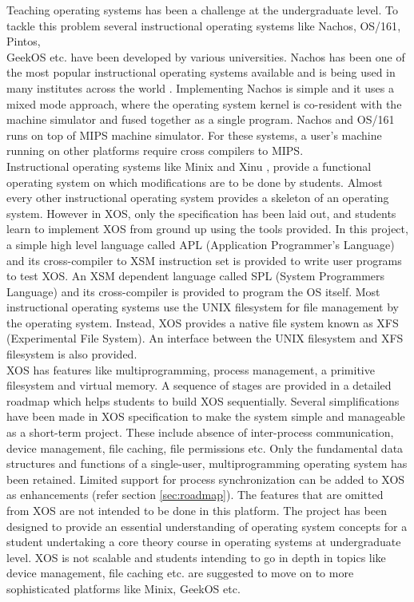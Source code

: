 \documentclass[10pt]{report}
\begin{document}
Teaching operating systems has been a challenge at the undergraduate level. To tackle this problem several instructional operating systems like Nachos\cite{nachos}, OS/161\cite{os161}, Pintos\cite{Pintos}, \\GeekOS \cite{survey} etc. have been developed by various universities. Nachos\cite{nachos} has been one of the most popular instructional operating systems available and is being used in many institutes across the world \cite{survey}. Implementing Nachos is simple and it uses a mixed mode approach, where the operating system kernel is co-resident with the machine simulator and fused together as a single program. Nachos\cite{nachos} and OS/161\cite{os161} runs on top of MIPS machine simulator. For these systems, a user's machine running on other platforms require cross compilers to MIPS. \\

 
Instructional operating systems like Minix and Xinu \cite{survey}, provide a functional operating system on which modifications are to be done by students. Almost every other instructional operating system provides a skeleton of an operating system. However in XOS, only the specification has been laid out, and students learn to implement XOS from ground up using the tools provided. In this project, a simple high level language called APL (Application Programmer's Language) and its cross-compiler to XSM instruction set is provided to write user programs to test XOS. An XSM dependent language called SPL (System Programmers Language) and its cross-compiler is provided to program the OS itself. Most instructional operating systems use the UNIX filesystem for file management by the operating system. Instead, XOS provides a native file system known as XFS (Experimental File System). An interface between the UNIX filesystem and XFS filesystem is also provided.  \\

XOS has features like multiprogramming, process management, a primitive  filesystem and virtual memory. A sequence of stages are provided in a detailed roadmap which helps students to build XOS sequentially. Several simplifications have been made in XOS specification to make the system simple and manageable as a short-term project. These include absence of inter-process communication, device management, file caching, file permissions etc.  Only the fundamental data structures and functions of a single-user, multiprogramming operating system has been retained. Limited support for process synchronization can be added to XOS as enhancements (refer section \ref{sec:roadmap}). The features that are omitted from XOS are not intended to be done in this platform. The project has been designed to provide an essential understanding of operating system concepts for a student undertaking a core theory course in  operating systems at undergraduate level. XOS is not scalable and students intending to go in depth in topics like device management, file caching etc. are suggested to move on to more sophisticated platforms like Minix, GeekOS\cite{survey} etc. \\
\end{document}
